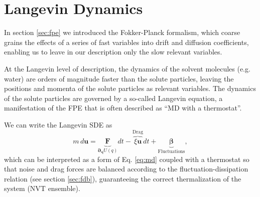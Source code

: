 \documentclass[ twoside,openright,titlepage,numbers=noenddot,%
headinclude,footinclude,cleardoublepage=empty,abstract=on,
BCOR=5mm,paper=b5,fontsize=11pt, dvipsnames
]{scrreprt}
\renewcommand{\vec}[1]{\bm{#1}}
\newcommand{\ppos}{q}
\newcommand{\pvel}{u}
\begin{document}

\chapter{Langevin Dynamics}\label{sec:langevin}
In section \ref{sec:fpe} we introduced the Fokker-Planck formalism, which coarse grains the effects of a series of fast variables into drift and diffusion coefficients, enabling us to leave in our description only the slow relevant variables.

At the Langevin level of description, the dynamics of the solvent molecules (e.g. water) are orders of magnitude faster than the solute particles, leaving the positions and momenta of the solute particles as relevant variables. The dynamics of the solute particles are governed by a so-called Langevin equation, a manifestation of the \gls{FPE} that is often described as ``\gls{MD} with a thermostat''.

We can write the Langevin \gls{SDE} as
\begin{equation}
  \label{eq:langevin}
  m\, d\vec{\pvel} = \underbrace{\vec{F}}_{\vec{\partial}_{\vec{\ppos}}U(\ppos)}dt - \overbrace{\xi\vec{\pvel}}^{\text{Drag}}dt + \underbrace{\vec{\beta}}_{\text{Fluctuations}},
\end{equation}
which can be interpreted as a form of Eq. \eqref{eq:md} coupled with a thermostat so that noise and drag forces are balanced according to the fluctuation-dissipation relation (see section \ref{sec:fdb}), guaranteeing the correct thermalization of the system (NVT ensemble).
\end{document}
